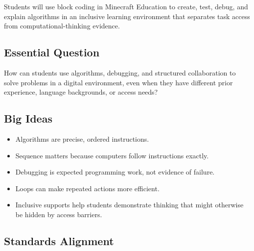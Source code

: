 \documentclass[12pt]{article}
\begin{document}
Students will use block coding in Minecraft Education to create, test, debug, and explain algorithms in an inclusive learning environment that separates task access from computational-thinking evidence.

\subsection{Essential Question}

How can students use algorithms, debugging, and structured collaboration to solve problems in a digital environment, even when they have different prior experience, language backgrounds, or access needs?

\subsection{Big Ideas}

\begin{itemize}
\item Algorithms are precise, ordered instructions.
\item Sequence matters because computers follow instructions exactly.
\item Debugging is expected programming work, not evidence of failure.
\item Loops can make repeated actions more efficient.
\item Inclusive supports help students demonstrate thinking that might otherwise be hidden by access barriers.
\end{itemize}

\newpage
\subsection{Standards Alignment}
\end{document}
